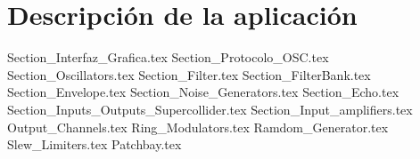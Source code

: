 \chapter{Descripción de la aplicación}

	{Section_Interfaz_Grafica.tex}
	{Section_Protocolo_OSC.tex}
	{Section_Oscillators.tex}
	{Section_Filter.tex}	
	{Section_FilterBank.tex}	
	{Section_Envelope.tex}	
	{Section_Noise_Generators.tex}
	{Section_Echo.tex}
	{Section_Inputs_Outputs_Supercollider.tex}
	{Section_Input_amplifiers.tex}
	{Output_Channels.tex}
	{Ring_Modulators.tex}
	{Ramdom_Generator.tex}
	{Slew_Limiters.tex}
	{Patchbay.tex}